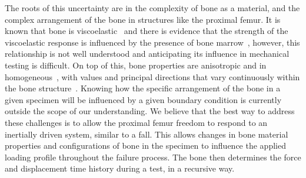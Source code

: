 The roots of this uncertainty are in the complexity of bone as a material, and the complex arrangement of the bone in structures like the proximal femur.
It is known that bone is viscoelastic~\citep{carter_compressive_1977, linde_mechanical_1991, mcelhaney_dynamic_1966, crowninshield_response_1974} and there is evidence that the strength of the viscoelastic response is influenced by the presence of bone marrow~\citep{carter_compressive_1977}, however, this relationship is not well understood and anticipating its influence in mechanical testing is difficult.
On top of this, bone properties are anisotropic and in homogeneous~\citep{keaveny_biomechanics_2001}, with values and principal directions that vary continuously within the bone structure~\citep{ascenzi_variation_2011, nazarian_densitometric_2007}.
Knowing how the specific arrangement of the bone in a given specimen will be influenced by a given boundary condition is currently outside the scope of our understanding.
We believe that the best way to address these challenges is to allow the proximal femur freedom to respond to an inertially driven system, similar to a fall.
This allows changes in bone material properties and configurations of bone in the specimen to influence the applied loading profile throughout the failure process.
The bone then determines the force and displacement time history during a test, in a recursive way.

